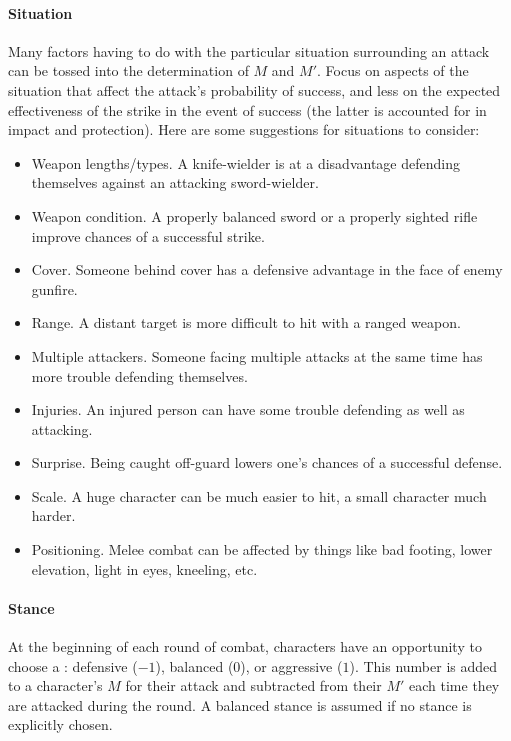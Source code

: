 \paragraph{Situation}
Many factors having to do with the particular situation
surrounding an attack can be tossed into the determination of $M$ and $M'$.
Focus on
aspects of the situation that affect the attack's probability of success,
and less on the expected effectiveness of the strike in the
event of success (the latter is accounted for in impact and protection).
Here are some suggestions for situations to consider:
\vspace{-1em}\begin{itemize}
\item Weapon lengths/types. A knife-wielder is at a disadvantage defending themselves against an attacking sword-wielder.
\item Weapon condition. A properly balanced sword or a properly sighted rifle improve chances of a successful strike.
\item Cover. Someone behind cover has a defensive advantage in the face of enemy gunfire.
\item Range. A distant target is more difficult to hit with a ranged weapon.
\item Multiple attackers. Someone facing multiple attacks at the same time has more trouble defending themselves.
\item Injuries. An injured person can have some trouble defending as well as attacking.
\item Surprise. Being caught off-guard lowers one's chances of a successful defense.
\item Scale. A huge character can be much easier to hit, a small character much harder.
\item Positioning. Melee combat can be affected by things like bad footing,
lower elevation, light in eyes, kneeling, etc. %
\end{itemize}




\paragraph{Stance}
At the beginning of each round of combat,
characters have an opportunity to choose a :
defensive ($-1$), balanced ($0$), or aggressive ($1$).
This number is added to a character's $M$ for their attack and subtracted from their
$M'$ each time they are attacked during the round.
A balanced stance is assumed if no stance is explicitly chosen.


